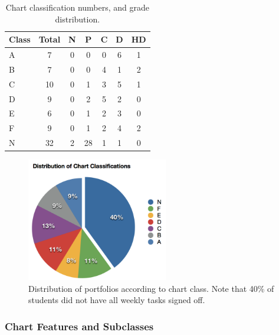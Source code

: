 \begin{table}[htbp]
  \footnotesize
  \renewcommand{\arraystretch}{1.3}
  \caption{Chart classification numbers, and grade distribution.}
  \label{tbl:chart_numbers}
  \centering
    \begin{tabular}{l|c|c|c|c|c|c}
        Class & Total & N & P  & C & D & HD \\ \hline
        A     & 7     & 0 & 0  & 0 & 6 & 1  \\ 
        B     & 7     & 0 & 0  & 4 & 1 & 2  \\ 
        C     & 10    & 0 & 1  & 3 & 5 & 1  \\ 
        D     & 9     & 0 & 2  & 5 & 2 & 0  \\ 
        E     & 6     & 0 & 1  & 2 & 3 & 0  \\ 
        F     & 9     & 0 & 1  & 2 & 4 & 2  \\ 
        N     & 32    & 2 & 28 & 1 & 1 & 0  
    \end{tabular}
\end{table}

\begin{figure}[thb]
  \centering
  \includegraphics[width=0.55\textwidth]{DistributionOfChartClassifications}
  \caption{Distribution of portfolios according to chart class. Note that 40\% of students did not have all weekly tasks signed off.}
  \label{fig:chart_dist}
\end{figure}


\subsubsection{Chart Features and Subclasses} %
\label{sub:chart_subclasses}


